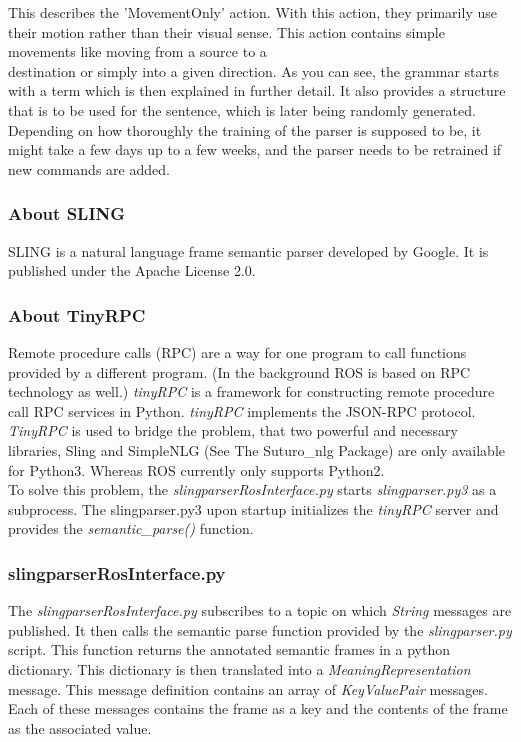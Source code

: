 \documentclass[main.tex]{subfiles}
\begin{document}
            This describes the 'MovementOnly' action.
            With this action, they primarily use their motion rather than their visual sense. This action contains simple movements like moving from a source to a\\ destination or simply into a given direction.            
            As you can see, the grammar starts with a term which is then explained in further detail. It also provides a structure that is to be used for the sentence, which is later being randomly generated.\\ 
            Depending on how thoroughly the training of the parser is supposed to be, it might take a few days up to a few weeks, and the parser needs to be retrained if new commands are added.
        
        \subsubsection{About SLING}
            SLING is a natural language frame semantic parser developed by Google. It is published under the Apache License 2.0.
        \subsubsection{About TinyRPC}
             Remote procedure calls (RPC) are a way for one program to call functions provided by a different program. (In the background ROS is based on RPC technology as well.) \textit{tinyRPC} is a framework for constructing remote procedure call RPC services in Python. \textit{tinyRPC} implements the JSON-RPC protocol.\\
             \textit{TinyRPC} is used to bridge the problem, that two powerful and necessary libraries, Sling and SimpleNLG (See The Suturo\_nlg Package) are only available for Python3. Whereas ROS currently only supports Python2.\\
             To solve this problem, the \textit{slingparserRosInterface.py} starts \textit{slingparser.py3} as a subprocess. The slingparser.py3 upon startup initializes the \textit{tinyRPC} server and provides the \textit{semantic\_parse()} function.
        \subsubsection[slingparserros]{slingparserRosInterface.py}
            The \textit{slingparserRosInterface.py} subscribes to a topic on which \textit{String} messages are published. It then calls the semantic parse function provided by the \textit{slingparser.py} script. This function returns the annotated semantic frames in a python dictionary. This dictionary is then translated into a \textit{MeaningRepresentation} message. This message definition contains an array of \textit{KeyValuePair} messages. Each of these messages contains the frame as a key and the contents of the frame as the associated value.
\end{document}
